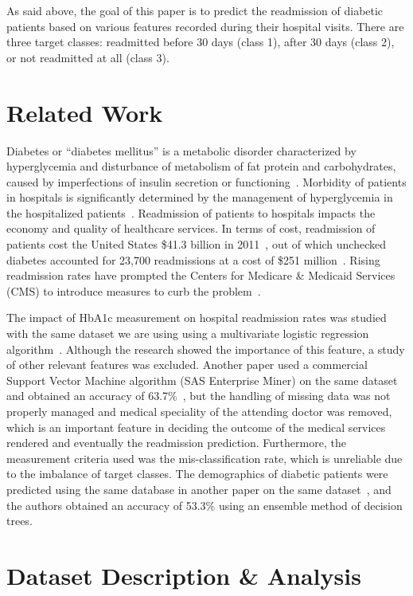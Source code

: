 \documentclass[conference]{IEEEtran}
\begin{document}
As said above, the goal of this paper is to predict the readmission of diabetic patients based on various features recorded during their hospital visits. There are three target classes: readmitted before 30 days (class 1), after 30 days (class 2), or not readmitted at all (class 3).

\section{Related Work}

Diabetes or “diabetes mellitus” is a metabolic disorder characterized by hyperglycemia and disturbance of metabolism of fat protein and carbohydrates, caused by imperfections of insulin secretion or functioning~\cite{worldhealthorganization-2015}. Morbidity of patients in hospitals is significantly determined by the management of hyperglycemia in the hospitalized patients~\cite{hyperglycemia-2002, unrecognizeddiabetes-1998}. Readmission of patients to hospitals impacts the economy and quality of healthcare services. In terms of cost, readmission of patients cost the United States \$41.3 billion in 2011~\cite{estimates-2011}, out of which unchecked diabetes accounted for 23,700 readmissions at a cost of \$251 million~\cite{sas-2015}. Rising readmission rates have prompted the Centers for Medicare \& Medicaid Services (CMS) to introduce measures to curb the problem~\cite{readmissionreduction-2015}.

The impact of HbA1c measurement on hospital readmission rates was studied with the same dataset we are using using a multivariate logistic regression algorithm~\cite{hba1c-2014}. Although the research showed the importance of this feature, a study of other relevant features was excluded. Another paper used a commercial Support Vector Machine algorithm (SAS Enterprise Miner) on the same dataset and obtained an accuracy of 63.7\%~\cite{sas-2015}, but the handling of missing data was not properly managed and medical speciality of the attending doctor was removed, which is an important feature in deciding the outcome of the medical services rendered and eventually the readmission prediction. Furthermore, the measurement criteria used was the mis-classification rate, which is unreliable due to the imbalance of target classes. The demographics of diabetic patients were predicted using the same database in another paper on the same dataset~\cite{cotha-2015}, and the authors obtained an accuracy of 53.3\% using an ensemble method of decision trees.

\section{Dataset Description \& Analysis}
\end{document}
